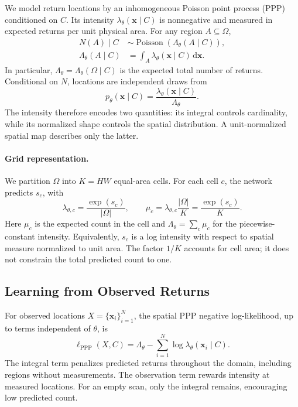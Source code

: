 We model return locations by an inhomogeneous Poisson point process (PPP) conditioned on $C$.
Its intensity $\lambda_\theta(\mathbf{x}\mid C)$ is nonnegative and measured in expected returns per unit physical area.
For any region $A\subseteq\Omega$,
\begin{equation}
\begin{aligned}
N(A)\mid C &\sim \operatorname{Poisson}(\Lambda_\theta(A\mid C)),\\
\Lambda_\theta(A\mid C)&=\int_A\lambda_\theta(\mathbf{x}\mid C)\,\mathrm{d}\mathbf{x}.
\end{aligned}
\label{eq:regional_count}
\end{equation}
In particular, $\Lambda_\theta=\Lambda_\theta(\Omega\mid C)$ is the expected total number of returns.
Conditional on $N$, locations are independent draws from
\begin{equation}
p_\theta(\mathbf{x}\mid C)
=\frac{\lambda_\theta(\mathbf{x}\mid C)}{\Lambda_\theta}.
\label{eq:normalized_location}
\end{equation}
The intensity therefore encodes two quantities: its integral controls cardinality, while its normalized shape controls the spatial distribution.
A unit-normalized spatial map describes only the latter.

\paragraph{Grid representation.}
We partition $\Omega$ into $K=HW$ equal-area cells.
For each cell $c$, the network predicts $s_c$, with
\begin{equation}
\lambda_{\theta,c}=\frac{\exp(s_c)}{|\Omega|},
\qquad
\mu_c=\lambda_{\theta,c}\frac{|\Omega|}{K}
=\frac{\exp(s_c)}{K}.
\label{eq:cell_mass}
\end{equation}
Here $\mu_c$ is the expected count in the cell and $\Lambda_\theta=\sum_c\mu_c$ for the piecewise-constant intensity.
Equivalently, $s_c$ is a log intensity with respect to spatial measure normalized to unit area.
The factor $1/K$ accounts for cell area; it does not constrain the total predicted count to one.

\subsection{Learning from Observed Returns}

For observed locations $X=\{\mathbf{x}_i\}_{i=1}^N$, the spatial PPP negative log-likelihood, up to terms independent of $\theta$, is
\begin{equation}
\ell_{\mathrm{PPP}}(X,C)
=\Lambda_\theta-\sum_{i=1}^{N}\log\lambda_\theta(\mathbf{x}_i\mid C).
\label{eq:continuous_ppp_nll}
\end{equation}
The integral term penalizes predicted returns throughout the domain, including regions without measurements.
The observation term rewards intensity at measured locations.
For an empty scan, only the integral remains, encouraging low predicted count.

